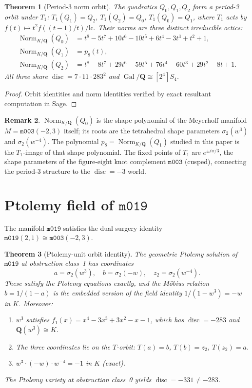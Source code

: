 \documentclass[12pt]{amsart}
\newtheorem{theorem}{Theorem}[section]
\theoremstyle{definition}
\newtheorem{remark}[theorem]{Remark}
\newcommand{\QQ}{\mathbf{Q}}
\DeclareMathOperator{\Norm}{Norm}
\DeclareMathOperator{\Gal}{Gal}
\DeclareMathOperator{\disc}{disc}
\newcommand{\M}{\texttt{m003}}
\newcommand{\Meyer}{\texttt{m003}(-2,3)}
\newcommand{\mzero}{\texttt{m019}}
\begin{document}
\begin{theorem}[Period-3 norm orbit]\label{thm:norm-orbit}
The quadratics $Q_0, Q_1, Q_2$ form a period-3 orbit under $T_1$:
$T_1(Q_1) = Q_2$, $T_1(Q_2) = Q_0$, $T_1(Q_0) = Q_1$,
where $T_1$ acts by $f(t) \mapsto t^2 f((t-1)/t)/\text{lc}$.
Their norms are three distinct irreducible octics:
\begin{align*}
  \Norm_{K/\QQ}(Q_0) &= t^8-5t^7+10t^6-10t^5+6t^4-3t^3+t^2+1,\\
  \Norm_{K/\QQ}(Q_1) &= p_8(t),\\
  \Norm_{K/\QQ}(Q_2) &= t^8-8t^7+29t^6-59t^5+76t^4-60t^3+29t^2-8t+1.
\end{align*}
All three share $\disc = 7 \cdot 11 \cdot 283^2$ and
$\Gal/\QQ \cong [2^4]S_4$.
\end{theorem}

\begin{proof}
Orbit identities and norm identities verified by exact resultant
computation in Sage.
\end{proof}

\begin{remark}
$\Norm_{K/\QQ}(Q_0)$ is the shape polynomial of the Meyerhoff manifold
$M = \Meyer$ itself; its roots are the tetrahedral shape parameters
$\sigma_2(w^3)$ and $\sigma_2(w^{-4})$.
The polynomial $p_8 = \Norm_{K/\QQ}(Q_1)$ studied in this paper is
the $T_1$-image of that shape polynomial.
The fixed points of $T_1$ are $e^{\pm i\pi/3}$, the shape parameters
of the figure-eight knot complement $\M$ (cusped), connecting the
period-3 structure to the $\disc = -3$ world.
\end{remark}

\section{Ptolemy field of \texorpdfstring{$\mzero$}{m019}}

The manifold $\mzero$ satisfies the dual surgery identity
$\mzero(2,1) \cong \Meyer$.

\begin{theorem}[Ptolemy-unit orbit identity]\label{thm:ptolemy}
The geometric Ptolemy solution of $\mzero$ at obstruction class~1
has coordinates
\[
  a = \sigma_2(w^3),\quad b = \sigma_2(-w),\quad z_2 = \sigma_2(w^{-4}).
\]
These satisfy the Ptolemy equations exactly, and the M\"{o}bius relation
$b = 1/(1-a)$ is the embedded version of the field identity
$1/(1-w^3) = -w$ in $K$.
Moreover:
\begin{enumerate}
\item $w^3$ satisfies $f_1(x) = x^4 - 3x^3 + 3x^2 - x - 1$, which
  has $\disc = -283$ and $\QQ(w^3) \cong K$.
\item The three coordinates lie on the $T$-orbit:
  $T(a) = b$, $T(b) = z_2$, $T(z_2) = a$.
\item $w^3 \cdot (-w) \cdot w^{-4} = -1$ in $K$ (exact).
\end{enumerate}
The Ptolemy variety at obstruction class~0 yields $\disc = -331 \ne -283$.
\end{theorem}
\end{document}
